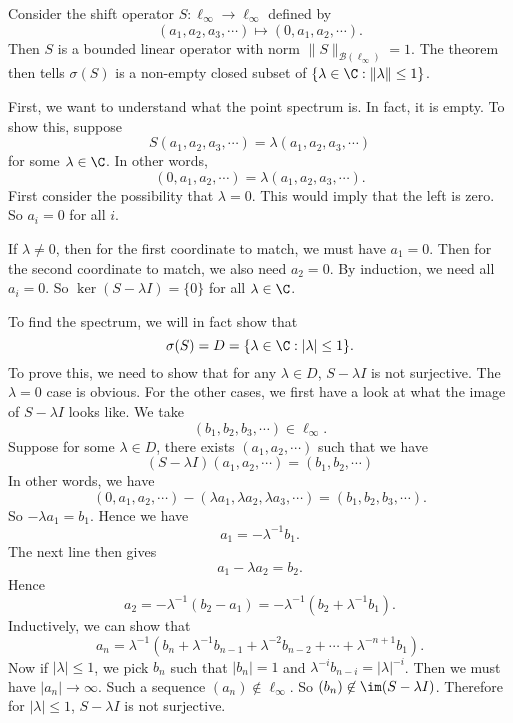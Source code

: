 \documentclass[a4paper]{article}
\begin{document}
\begin{eg}
  Consider the shift operator $S: \ell_\infty \to \ell_\infty$ defined by
  \[
    (a_1, a_2, a_3, \cdots) \mapsto (0, a_1, a_2, \cdots).
  \]
  Then $S$ is a bounded linear operator with norm $\|S\|_{\mathcal{B}(\ell_\infty)} = 1$. The theorem then tells $\sigma(S)$ is a non-empty closed subset of $\{\lambda \in \C: \|\lambda\| \leq 1\}$.

  First, we want to understand what the point spectrum is. In fact, it is empty. To show this, suppose
  \[
    S(a_1, a_2, a_3, \cdots) = \lambda (a_1, a_2, a_3, \cdots)
  \]
  for some $\lambda \in \C$. In other words,
  \[
    (0, a_1, a_2, \cdots) = \lambda (a_1, a_2, a_3, \cdots).
  \]
  First consider the possibility that $\lambda = 0$. This would imply that the left is zero. So $a_i = 0$ for all $i$.

  If $\lambda \not= 0$, then for the first coordinate to match, we must have $a_1 = 0$. Then for the second coordinate to match, we also need $a_2 = 0$. By induction, we need all $a_i = 0$. So $\ker (S - \lambda I) = \{0\}$ for all $\lambda \in \C$.

  To find the spectrum, we will in fact show that
  \[
    \sigma(S) = D = \{\lambda \in \C: |\lambda| \leq 1\}.
  \]
  To prove this, we need to show that for any $\lambda \in D$, $S - \lambda I$ is not surjective. The $\lambda = 0$ case is obvious. For the other cases, we first have a look at what the image of $S - \lambda I$ looks like. We take
  \[
    (b_1, b_2, b_3, \cdots) \in \ell_\infty.
  \]
  Suppose for some $\lambda \in D$, there exists $(a_1, a_2, \cdots)$ such that we have
  \[
    (S - \lambda I) (a_1, a_2, \cdots) = (b_1, b_2, \cdots)
  \]
  In other words, we have
  \[
    (0, a_1, a_2, \cdots) - (\lambda a_1, \lambda a_2, \lambda a_3, \cdots) = (b_1, b_2, b_3, \cdots).
  \]
  So $-\lambda a_1 = b_1$. Hence we have
  \[
    a_1 = -\lambda^{-1} b_1.
  \]
  The next line then gives
  \[
    a_1 - \lambda a_2 = b_2.
  \]
  Hence
  \[
    a_2 = -\lambda^{-1}(b_2 - a_1) = -\lambda^{-1} (b_2 + \lambda^{-1} b_1).
  \]
  Inductively, we can show that
  \[
    a_n = \lambda^{-1}(b_n + \lambda^{-1} b_{n - 1} + \lambda^{-2}b_{n - 2} + \cdots + \lambda^{-n + 1}b_1).
  \]
  Now if $|\lambda| \leq 1$, we pick $b_n$ such that $|b_n| = 1$ and $\lambda^{-i}b_{n - i} = |\lambda|^{-i}$. Then we must have $|a_n| \to \infty$. Such a sequence $(a_n) \not\in \ell_\infty$. So $(b_n) \not\in \im (S - \lambda I)$. Therefore for $|\lambda| \leq 1$, $S - \lambda I$ is not surjective.


\end{eg}
\end{document}
